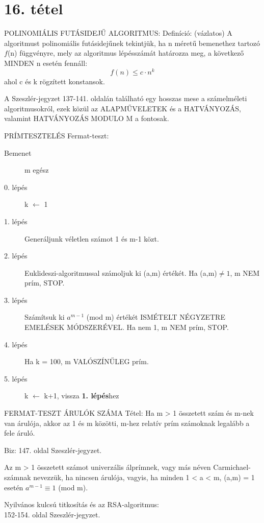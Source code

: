\section{16. tétel}

\begin{definicio}{
POLINOMIÁLIS FUTÁSIDEJŰ ALGORITMUS}: Definíció: (vázlatos) A algoritmust polinomiális futásidejűnek tekintjük, ha n méretű bemenethez tartozó $f$(n) függvényre, mely az algoritmus lépésszámát határozza meg, a következő MINDEN n esetén fennáll:
$$f(n) \leq c\cdot n^k$$ ahol c és k rögzített konstansok.
\end{definicio}
A Szeszlér-jegyzet 137-141. oldalán található egy hosszas mese a számelméleti algoritmusokról, ezek közül az ALAPMŰVELETEK és a HATVÁNYOZÁS, valamint HATVÁNYOZÁS MODULO M a fontosak.
\begin{tetel}{
PRÍMTESZTELÉS Fermat-teszt}:
\begin{description}
\item[Bemenet]m egész
\item[0. lépés]k $\leftarrow$ 1
\item[1. lépés]Generáljunk véletlen számot 1 és m-1 közt.
\item[2. lépés]Euklideszi-algoritmussal számoljuk ki (a,m) értékét. Ha (a,m)$\neq1$, m NEM prím, STOP.
\item[3. lépés]Számítsuk ki $a^{m-1}$ (mod m) értékét ISMÉTELT NÉGYZETRE EMELÉSEK MÓDSZERÉVEL. Ha nem 1, m NEM prím, STOP.
\item[4. lépés]Ha k = 100, m VALÓSZÍNŰLEG prím.
\item[5. lépés]k $\leftarrow$ k+1, vissza \textbf{1. lépés}hez
\end{description}
\end{tetel}
\begin{tetel}{
FERMAT-TESZT ÁRULÓK SZÁMA Tétel}: Ha m > 1 összetett szám és m-nek van árulója, akkor az 1 és m közötti, m-hez relatív prím számoknak legalább a fele áruló.
\end{tetel}
\begin{leftbar}
Biz: 147. oldal Szeszlér-jegyzet.
\end{leftbar}
\begin{definicio}{
Az m > 1 összetett számot univerzális álprímnek, vagy más néven Carmichael-számnak nevezzük, ha nincsen árulója, vagyis, ha minden 1 < a < m, (a,m) = 1 esetén $a^{m-1} \equiv 1$ (mod m)}.
\end{definicio}
Nyilvános kulcsú titkosítás és az RSA-algoritmus:\\
152-154. oldal Szeszlér-jegyzet.

